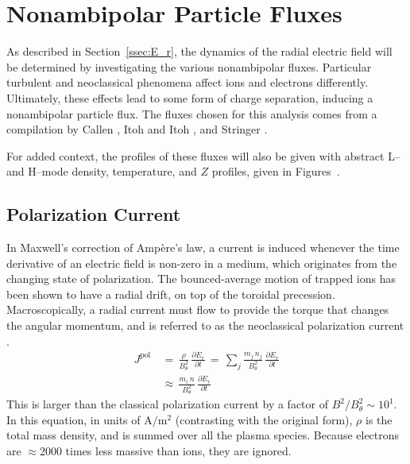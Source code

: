\section{Nonambipolar Particle Fluxes}\label{sec:nonambipolar_fluxes}
As described in Section~\ref{ssec:E_r}, the dynamics of the radial electric field will be determined by investigating the various nonambipolar fluxes.
Particular turbulent and neoclassical phenomena affect ions and electrons differently.
Ultimately, these effects lead to some form of charge separation, inducing a nonambipolar particle flux.
The fluxes chosen for this analysis comes from a compilation by Callen \cite{callen_toroidal_2009}, Itoh and Itoh \cite{itoh_role_1996}, and Stringer \cite{stringer_explanation_1993}.

For added context, the profiles of these fluxes will also be given with abstract L-- and H--mode density, temperature, and $Z$ profiles, given in Figures~.


\subsection{Polarization Current}\label{ssec:polarization_current}
In Maxwell's correction of Amp\`ere's law, a current is induced whenever the time derivative of an electric field is non-zero in a medium, which originates from the changing state of polarization.
The bounced-average motion of trapped ions has been shown to have a radial drift, on top of the toroidal precession.
Macroscopically, a radial current must flow to provide the torque that changes the angular momentum, and is referred to as the neoclassical polarization current \cite{hinton_neoclassical_1984}.
\begin{align} %
	J^\text{pol} \,&=\, \frac{\rho}{B_\theta^2} \,
		\frac{\partial E_r}{\partial t} \,=\, \sum_j \frac{m_j \, n_j }
		{B_\theta^2} \, \frac{\partial E_r}{\partial t} \\
	\,&\approx\, \frac{m_i \, n}{B_\theta^2} \, \frac{\partial E_r}{\partial t}
		\label{eq:polarization_current_original}
\end{align}
This is larger than the classical polarization current by a factor of $B^2 / B_\theta^2 \sim 10^1$.
In this equation, in units of $\text{A}/\text{m}^2$ (contrasting with the original form), $\rho$ is the total mass density, and is summed over all the plasma species.
Because electrons are $\approx 2000$ times less massive than ions, they are ignored.

